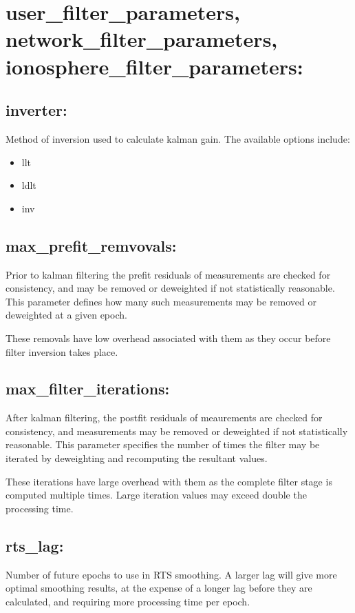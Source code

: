 \section{user\_filter\_parameters, network\_filter\_parameters, ionosphere\_filter\_parameters:}

\subsection{inverter:}
Method of inversion used to calculate kalman gain. The available options include:
\begin{itemize}
\item llt
\item ldlt
\item inv
\end{itemize}

\subsection{max\_prefit\_remvovals:}
Prior to kalman filtering the prefit residuals of measurements are checked for consistency, and may be removed or deweighted if not statistically reasonable. This parameter defines how many such measurements may be removed or deweighted at a given epoch.

These removals have low overhead associated with them as they occur before filter inversion takes place.

\subsection{max\_filter\_iterations:}
After kalman filtering, the postfit residuals of meaurements are checked for consistency, and measurements may be removed or deweighted if not statistically reasonable. This parameter specifies the number of times the filter may be iterated by deweighting and recomputing the resultant values.

These iterations have large overhead with them as the complete filter stage is computed multiple times. Large iteration values may exceed double the processing time.


\subsection{rts\_lag:}
Number of future epochs to use in RTS smoothing. A larger lag will give more optimal smoothing results, at the expense of a longer lag before they are calculated, and requiring more processing time per epoch.

